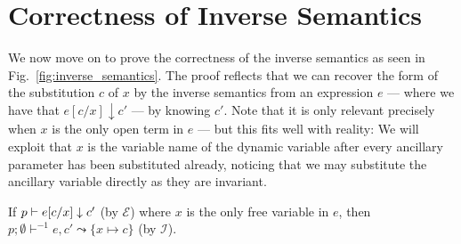 \section{Correctness of Inverse Semantics}

We now move on to prove the correctness of the inverse semantics as seen in
Fig.~\ref{fig:inverse_semantics}. The proof reflects that we can recover the
form of the substitution $c$ of $x$ by the inverse semantics from an expression
$e$ --- where  we have that $e[c / x] \downarrow c'$ --- by knowing $c'$. Note
that it is only relevant precisely when $x$ is the only open term in $e$ ---
but this fits well with reality: We will exploit that $x$ is the variable name
of the dynamic variable after every ancillary parameter has been substituted
already, noticing that we may substitute the ancillary variable directly as
they are invariant.

\begin{lemma}\label{thm:exactinv}

  If $p \vdash e[c / x] \downarrow c'$ (by $\mathcal{E}$) where $x$ is the only
  free variable in $e$, then $p; \emptyset \vdash^{-1} e, c' \leadsto \{x
  \mapsto c\}$ (by $\mathcal{I}$).

\end{lemma}


